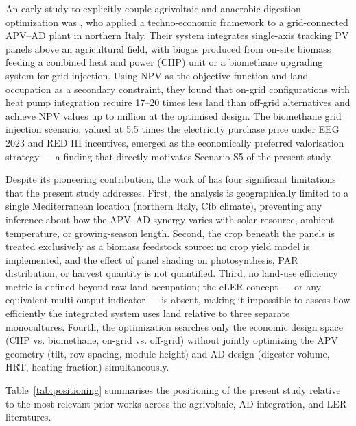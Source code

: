 \hspace{1cm}An early study to explicitly couple agrivoltaic and
anaerobic digestion optimization was \citet{nikzad2026}, who applied
a techno-economic framework to a grid-connected APV--AD plant in
northern Italy. Their system integrates single-axis tracking PV panels
above an agricultural field, with biogas produced from on-site biomass
feeding a combined heat and power (CHP) unit or a biomethane upgrading
system for grid injection. Using NPV as the objective function and land
occupation as a secondary constraint, they found that on-grid
configurations with heat pump integration require 17--20 times less
land than off-grid alternatives and achieve NPV values up to
 million at the optimised design. The biomethane grid
injection scenario, valued at 5.5 times the electricity purchase price
under EEG 2023 and RED III incentives, emerged as the economically
preferred valorisation strategy --- a finding that directly motivates
Scenario S5 of the present study.

Despite its pioneering contribution, the work of \citet{nikzad2026}
has four significant limitations that the present study addresses.
First, the analysis is geographically limited to a single
Mediterranean location (northern Italy, Cfb climate), preventing
any inference about how the APV--AD synergy varies with solar
resource, ambient temperature, or growing-season length.
Second, the crop beneath the panels is treated exclusively as a
biomass feedstock source: no crop yield model is implemented,
and the effect of panel shading on photosynthesis, PAR
distribution, or harvest quantity is not quantified.
Third, no land-use efficiency metric is defined beyond raw land
occupation; the eLER concept --- or any equivalent multi-output
indicator --- is absent, making it impossible to assess how
efficiently the integrated system uses land relative to three
separate monocultures.
Fourth, the optimization searches only the economic design space
(CHP vs. biomethane, on-grid vs. off-grid) without jointly
optimizing the APV geometry (tilt, row spacing, module height)
and AD design (digester volume, HRT, heating fraction)
simultaneously.

Table~\ref{tab:positioning} summarises the positioning of the
present study relative to the most relevant prior works across
the agrivoltaic, AD integration, and LER literatures.


